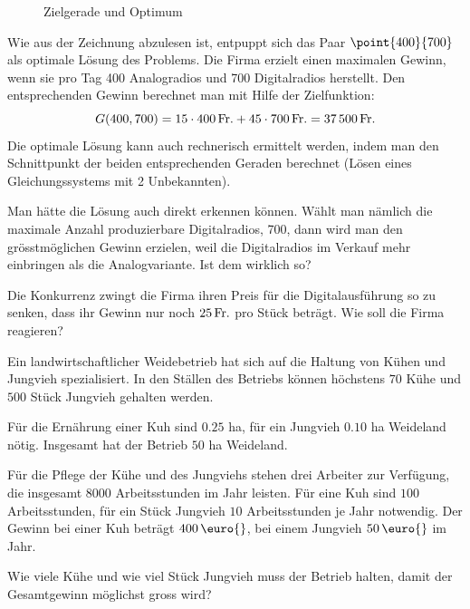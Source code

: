 \documentclass[%
11pt,%
twoside,%
titlepage,%
german,%
headsepline%
]{scrartcl}
\begin{document}
\begin{bsp}
\begin{figure}[h!]
\begin{center}
{
}
\end{center}
\caption{Zielgerade und Optimum}
\end{figure}
Wie aus der Zeichnung abzulesen ist, entpuppt sich das Paar $\point{400}{700}$ als optimale L\"osung des Problems. Die Firma erzielt einen maximalen Gewinn, wenn sie pro Tag 400 Analogradios und 700 Digitalradios herstellt. Den entsprechenden Gewinn berechnet man mit Hilfe der Zielfunktion:
$$G(400,700) = \unit[15\cdot400]{Fr.} + \unit[45\cdot700]{Fr.} = \unit[37\,500]{Fr.}$$
Die optimale L\"osung kann auch rechnerisch ermittelt werden, indem man den Schnittpunkt der beiden entsprechenden Geraden berechnet (L\"osen eines Gleichungssystems mit 2 Unbekannten).
\end{bsp}

\begin{bem}
Man h\"atte die L\"osung auch direkt erkennen k\"onnen. W\"ahlt man n\"amlich die maximale Anzahl produzierbare Digitalradios, 700, dann wird man den gr\"osstm\"oglichen Gewinn erzielen, weil die Digitalradios im Verkauf mehr einbringen als die Analogvariante. Ist dem wirklich so?
\end{bem}

\begin{ueb}
Die Konkurrenz zwingt die Firma ihren Preis f\"ur die Digitalausf\"uhrung so zu senken, dass ihr Gewinn nur noch $\unit[25]{Fr.}$ pro St\"uck betr\"agt. Wie soll die Firma reagieren?
\end{ueb}

\begin{ueb}
  Ein landwirtschaftlicher Weidebetrieb hat sich auf die Haltung von
  K\"uhen und Jungvieh spezialisiert. In den St\"allen des Betriebs
  k\"onnen h\"ochstens $70$ K\"uhe und $500$ St\"uck Jungvieh gehalten
  werden.

  \noindent F\"ur die Ern\"ahrung einer Kuh sind $0.25$ ha, f\"ur ein
  Jungvieh $0.10$ ha Weideland n\"otig. Insgesamt hat der Betrieb $50$
  ha Weideland.

  \noindent F\"ur die Pflege der K\"uhe und des Jungviehs stehen drei
  Arbeiter zur Verf\"ugung, die insgesamt $8000$ Arbeitsstunden im
  Jahr leisten. F\"ur eine Kuh sind $100$ Arbeitsstunden, f\"ur ein
  St\"uck Jungvieh $10$ Arbeitsstunden je Jahr notwendig. Der Gewinn
  bei einer Kuh betr\"agt $\unit[400]{\euro{}}$, bei einem Jungvieh $\unit[50]{\euro{}}$ im
  Jahr.

  \noindent Wie viele K\"uhe und wie viel St\"uck Jungvieh muss der
  Betrieb halten, damit der Gesamtgewinn m\"oglichst gross wird?
\end{ueb}
\end{document}

